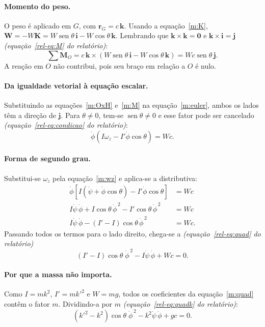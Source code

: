 \documentclass[11pt,a4paper]{article}
\newcommand{\vet}[1]{\mathbf{#1}}
\newcommand{\seno}{\operatorname{sen}}
\newcommand{\phid}{\dot{\phi}}
\newcommand{\psid}{\dot{\psi}}
\newcommand{\rel}[1]{\textit{(equação~\ref*{rel-eq:#1} do relatório)}}
\begin{document}
\paragraph{Momento do peso.} O peso é aplicado em $G$, com $\vet{r}_G=c\,\vet{k}$. Usando a equação~\ref{m:K}, $\vet{W}=-W\vet{K}=W\seno\theta\,\vet{i}-W\cos\theta\,\vet{k}$. Lembrando que $\vet{k}\times\vet{k}=\vet{0}$ e $\vet{k}\times\vet{i}=\vet{j}$ \rel{M}:
\begin{equation}
\sum\vet{M}_O=c\,\vet{k}\times\left(W\seno\theta\,\vet{i}-W\cos\theta\,\vet{k}\right)=Wc\seno\theta\,\vet{j}.\label{m:M}
\end{equation}
A reação em $O$ não contribui, pois seu braço em relação a $O$ é nulo.

\paragraph{Da igualdade vetorial à equação escalar.} Substituindo as equações~\ref{m:OxH} e~\ref{m:M} na equação~\ref{m:euler}, ambos os lados têm a direção de $\vet{j}$. Para $\theta\neq0$, tem-se $\seno\theta\neq0$ e esse fator pode ser cancelado \rel{condicao}:
\begin{equation}
\phid\left(I\omega_z-I'\phid\cos\theta\right)=Wc.\label{m:cond}
\end{equation}

\paragraph{Forma de segundo grau.} Substitui-se $\omega_z$ pela equação~\ref{m:wz} e aplica-se a distributiva:
\begin{align}
\phid\left[I\left(\psid+\phid\cos\theta\right)-I'\phid\cos\theta\right]&=Wc\nonumber\\
I\psid\,\phid+I\cos\theta\,\phid^{\,2}-I'\cos\theta\,\phid^{\,2}&=Wc\nonumber\\
I\psid\,\phid-(I'-I)\cos\theta\,\phid^{\,2}&=Wc.\label{m:intermed}
\end{align}
Passando todos os termos para o lado direito, chega-se a \rel{quad}
\begin{equation}
(I'-I)\cos\theta\;\phid^{\,2}-I\psid\,\phid+Wc=0.\label{m:quad}
\end{equation}

\paragraph{Por que a massa não importa.} Como $I=mk^2$, $I'=mk'^2$ e $W=mg$, todos os coeficientes da equação~\ref{m:quad} contêm o fator $m$. Dividindo-a por $m$ \rel{quadk}:
\begin{equation}
(k'^2-k^2)\cos\theta\;\phid^{\,2}-k^2\psid\,\phid+gc=0.
\end{equation}
\end{document}
